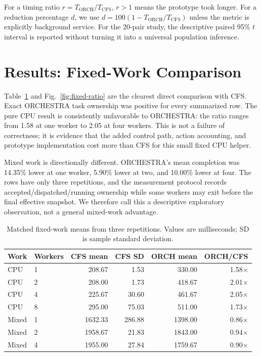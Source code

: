 \documentclass[10pt,letterpaper,twocolumn]{article}
\begin{document}
For a timing ratio $r=T_{\mathrm{ORCH}}/T_{\mathrm{CFS}}$, $r>1$ means the prototype took longer. For a reduction percentage $d$, we use $d=100(1-T_{\mathrm{ORCH}}/T_{\mathrm{CFS}})$ unless the metric is explicitly background service. For the 20-pair study, the descriptive paired 95\% $t$ interval is reported without turning it into a universal population inference.

\section{Results: Fixed-Work Comparison}

Table~\ref{tab:fixed-work} and Fig.~\ref{fig:fixed-ratio} are the clearest direct comparison with CFS. Exact ORCHESTRA task ownership was positive for every summarized row. The pure CPU result is consistently unfavorable to ORCHESTRA: the ratio ranges from 1.58 at one worker to 2.05 at four workers. This is not a failure of correctness; it is evidence that the added control path, action accounting, and prototype implementation cost more than CFS for this small fixed CPU helper.

Mixed work is directionally different. ORCHESTRA's mean completion was 14.35\% lower at one worker, 5.90\% lower at two, and 10.00\% lower at four. The rows have only three repetitions, and the measurement protocol records accepted/dispatched/running ownership while some workers may exit before the final effective snapshot. We therefore call this a descriptive exploratory observation, not a general mixed-work advantage.

\begin{table}[t]
\centering\scriptsize
\caption{Matched fixed-work means from three repetitions. Values are milliseconds; SD is sample standard deviation.}
\label{tab:fixed-work}
\begin{tabular}{llrrrr}
\toprule
Work & Workers & CFS mean & CFS SD & ORCH mean & ORCH/CFS \\
\midrule
CPU & 1 & 208.67 & 1.53 & 330.00 & 1.58$\times$ \\
CPU & 2 & 208.00 & 1.73 & 418.67 & 2.01$\times$ \\
CPU & 4 & 225.67 & 30.60 & 461.67 & 2.05$\times$ \\
CPU & 8 & 295.00 & 75.03 & 511.00 & 1.73$\times$ \\
Mixed & 1 & 1632.33 & 286.88 & 1398.00 & 0.86$\times$ \\
Mixed & 2 & 1958.67 & 21.83 & 1843.00 & 0.94$\times$ \\
Mixed & 4 & 1955.00 & 27.84 & 1759.67 & 0.90$\times$ \\
\bottomrule
\end{tabular}
\end{table}
\end{document}
